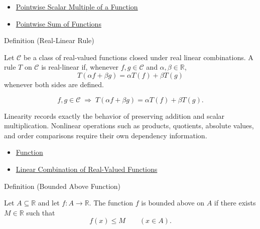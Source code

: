 \begin{dependencies}
\begin{itemize}
  \item \hyperref[def:pointwise-scalar-multiple-of-a-function]{Pointwise Scalar Multiple of a Function}
  \item \hyperref[def:pointwise-sum-of-functions]{Pointwise Sum of Functions}
\end{itemize}
\end{dependencies}

\begin{definitionbox}{Definition (Real-Linear Rule)}
\begin{definition}
\label{def:real-linear-rule}
Let $\mathcal{C}$ be a class of real-valued functions closed under real
linear combinations.  A rule $T$ on $\mathcal{C}$ is real-linear if,
whenever $f,g\in\mathcal{C}$ and $\alpha,\beta\in\mathbb{R}$,
\[
  T(\alpha f+\beta g)=\alpha T(f)+\beta T(g)
\]
whenever both sides are defined.
\end{definition}
\end{definitionbox}

\begin{remark*}
\[
  f,g\in\mathcal{C}
  \;\Longrightarrow\;
  T(\alpha f+\beta g)=\alpha T(f)+\beta T(g).
\]
\end{remark*}

\begin{remark*}[Interpretation]
Linearity records exactly the behavior of preserving addition and scalar
multiplication. Nonlinear operations such as products, quotients, absolute
values, and order comparisons require their own dependency information.
\end{remark*}

\begin{dependencies}
\begin{itemize}
  \item \hyperref[def:function]{Function}
  \item \hyperref[def:linear-combination-of-real-valued-functions]{Linear Combination of Real-Valued Functions}
\end{itemize}
\end{dependencies}


\begin{definitionbox}{Definition (Bounded Above Function)}
\begin{definition}
\label{def:function-bounded-above}
Let $A\subseteq\mathbb{R}$ and let $f:A\to\mathbb{R}$.  The function
$f$ is bounded above on $A$ if there exists $M\in\mathbb{R}$ such that
\[
  f(x)\leq M
  \qquad (x\in A).
\]
\end{definition}
\end{definitionbox}

